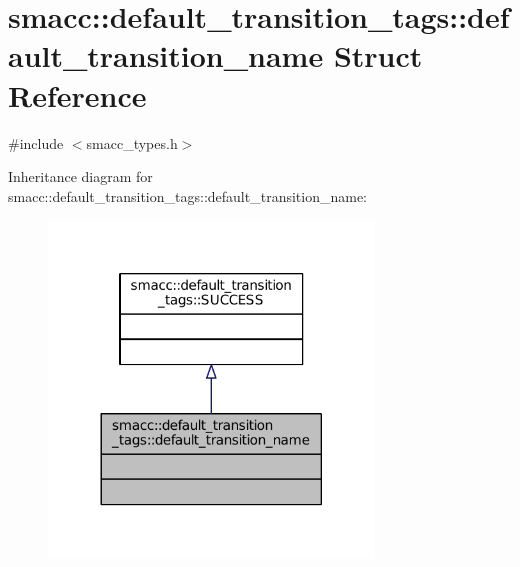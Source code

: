 \hypertarget{structsmacc_1_1default__transition__tags_1_1default__transition__name}{}\section{smacc\+:\+:default\+\_\+transition\+\_\+tags\+:\+:default\+\_\+transition\+\_\+name Struct Reference}
\label{structsmacc_1_1default__transition__tags_1_1default__transition__name}


{\ttfamily \#include $<$smacc\+\_\+types.\+h$>$}



Inheritance diagram for smacc\+:\+:default\+\_\+transition\+\_\+tags\+:\+:default\+\_\+transition\+\_\+name\+:
\nopagebreak
\begin{figure}[H]
\begin{center}
\leavevmode
\includegraphics[width=245pt]{structsmacc_1_1default__transition__tags_1_1default__transition__name__inherit__graph}
\end{center}
\end{figure}


